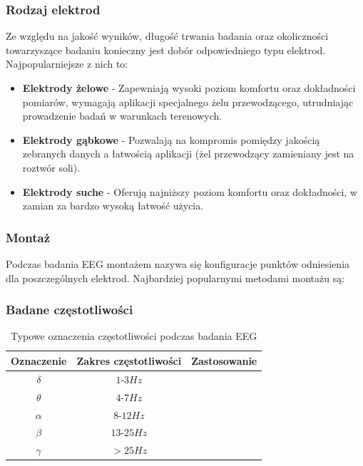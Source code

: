\documentclass{./assets/wfis}
\begin{document}
\subsubsection{Rodzaj elektrod}
Ze względu na jakość wyników, długość trwania badania oraz okoliczności towarzyszące badaniu konieczny jest dobór odpowiedniego typu elektrod. Najpopularniejsze z nich to:

\begin{itemize}
    \item \textbf{Elektrody żelowe} - Zapewniają wysoki poziom komfortu oraz dokładności pomiarów, wymagają aplikacji specjalnego żelu przewodzącego, utrudniając prowadzenie badań w warunkach terenowych.
    \item \textbf{Elektrody gąbkowe} - Pozwalają na kompromis pomiędzy jakością zebranych danych a łatwością aplikacji (żel przewodzący zamieniany jest na roztwór soli).
    \item \textbf{Elektrody suche} - Oferują najniższy poziom komfortu oraz dokładności, w zamian za bardzo wysoką łatwość użycia.
\end{itemize}

\subsubsection{Montaż}
Podczas badania EEG montażem nazywa się konfiguracje punktów odniesienia dla poszczególnych elektrod. Najbardziej popularnymi metodami montażu są:


\subsubsection{Badane częstotliwości}

\begin{table}[h]
    \centering
    \begin{tabular}{|c|c|c|}
        \hline
        Oznaczenie & Zakres częstotliwości & Zastosowanie \\
        \hline
        $\delta$ & $1$-$3Hz$ & \\
        $\theta$ & $4$-$7Hz$ & \\
        $\alpha$ & $8$-$12Hz$ & \\
        $\beta$  & $13$-$25Hz$ & \\
        $\gamma$ & $>25Hz$ & \\
        \hline
    \end{tabular}
    \caption{Typowe oznaczenia częstotliwości podczas badania EEG}
    \label{tab:freqs}
\end{table}
\end{document}
